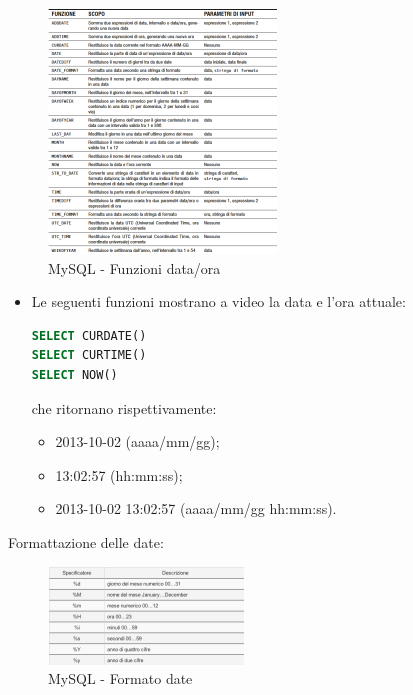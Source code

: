 \begin{itemize}
\begin{center}
\begin{figure}[H]
\centering
\includegraphics[scale=1]{figures/mySQL_data_ora.png}
\caption{MySQL - Funzioni data/ora} 
\end{figure}
\end{center}

\end{itemize}

\begin{itemize}

\item Le seguenti funzioni mostrano a video la data e l’ora attuale:

\begin{lstlisting}[language=SQL]
SELECT CURDATE()
SELECT CURTIME()
SELECT NOW()
\end{lstlisting}

che ritornano rispettivamente:

\begin{itemize}

\item 2013-10-02 (aaaa/mm/gg);
\item 13:02:57 (hh:mm:ss);
\item 2013-10-02 13:02:57 (aaaa/mm/gg hh:mm:ss).

\end{itemize}

\end{itemize}

Formattazione delle date:

\begin{center}
\begin{figure}[H]
\centering
\includegraphics[scale=1]{figures/mySQL_dateformat.png}
\caption{MySQL - Formato date} 
\end{figure}
\end{center}

